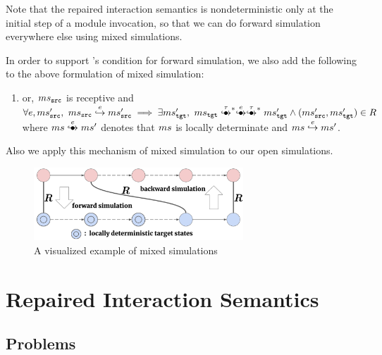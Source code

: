 Note that the repaired interaction semantics is nondeterministic only
at the initial step of a module invocation, so that we can do
forward simulation everywhere else using mixed simulations.

In order to support \cc{}'s condition for forward simulation,
we also add the following to the above formulation of mixed simulation:
\begin{enumerate}[resume]
\item or, $ms{}_{\texttt{src}{}}$ is receptive and\\
  $\forall e, \mssrc',~ \mssrc \estep{e} \mssrc' \implies {}
  \exists \mstgt',~ \mstgt \exstep{\tau}^{\raisebox{-1mm}{\scriptsize$\ast$}} \exstep{e}\exstep{\tau}^{\raisebox{-1mm}{\scriptsize$\ast$}} \mstgt' \land (\mssrc', \mstgt') \in R$\\
  where $\ms \exstep{e} \ms'$ denotes that $ms$ is locally determinate and $ms \stackrel{e}{\hookrightarrow} ms'$.
\end{enumerate}
Also we apply this mechanism of mixed simulation to our open simulations.

\begin{figure}[t]%
\includegraphics[width=0.7\textwidth]{images/mixed-sim-bold.pdf}
\caption{A visualized example of mixed simulations}
\label{fig:mixedsim}
\end{figure}






\section{Repaired Interaction Semantics}
\label{sec:overview-semantics}


\subsection{Problems}
\label{sec:overview-semantics:problems}

